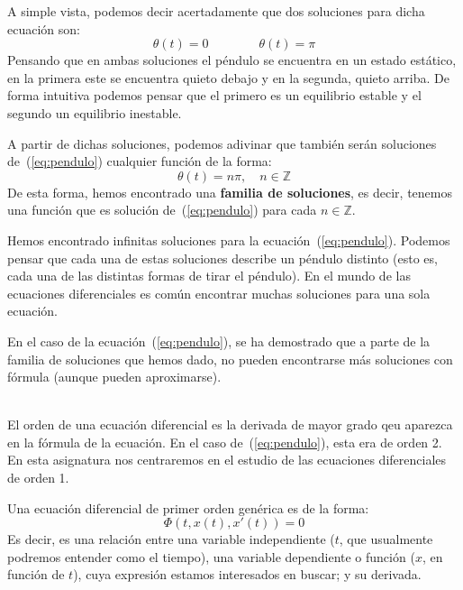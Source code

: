 \begin{ejemplo}
    A simple vista, podemos decir acertadamente que dos soluciones para dicha ecuación son:
    \begin{equation*}
        \theta(t) = 0 \qquad \qquad  \theta(t) = \pi
    \end{equation*}
    Pensando que en ambas soluciones el péndulo se encuentra en un estado estático, en la primera este se encuentra quieto debajo y en la segunda, quieto arriba. De forma intuitiva podemos pensar que el primero es un equilibrio estable y el segundo un equilibrio inestable.

    A partir de dichas soluciones, podemos adivinar que también serán soluciones de~(\ref{eq:pendulo}) cualquier función de la forma:
    \begin{equation*}
        \theta(t) = n\pi, \quad n \in \mathbb{Z}
    \end{equation*}
    De esta forma, hemos encontrado una \textbf{familia de soluciones}, es decir, tenemos una función que es solución de~(\ref{eq:pendulo}) para cada $n\in \mathbb{Z}$.

    Hemos encontrado infinitas soluciones para la ecuación~(\ref{eq:pendulo}). Podemos pensar que cada una de estas soluciones describe un péndulo distinto (esto es, cada una de las distintas formas de tirar el péndulo). En el mundo de las ecuaciones diferenciales es común encontrar muchas soluciones para una sola ecuación.

    En el caso de la ecuación~(\ref{eq:pendulo}), se ha demostrado que a parte de la familia de soluciones que hemos dado, no pueden encontrarse más soluciones con fórmula (aunque pueden aproximarse).
\end{ejemplo}~\\

El orden de una ecuación diferencial es la derivada de mayor grado qeu aparezca en la fórmula de la ecuación. En el caso de~(\ref{eq:pendulo}), esta era de orden 2. En esta asignatura nos centraremos en el estudio de las ecuaciones diferenciales de orden 1.

Una ecuación diferencial de primer orden genérica es de la forma:
\begin{equation}\label{eq_generica}
    \Phi(t,x(t), x'(t))=0
\end{equation}
Es decir, es una relación entre una variable independiente ($t$, que usualmente podremos entender como el tiempo), una variable dependiente o función ($x$, en función de $t$), cuya expresión estamos interesados en buscar; y su derivada.

